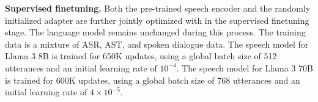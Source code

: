 \textbf{Supervised finetuning.}
Both the pre-trained speech encoder and the randomly initialized adapter are further jointly optimized with \llamathree in the supervised finetuning stage. The language model remains unchanged during this process.
The training data is a mixture of ASR, AST, and spoken dialogue data.
The speech model for Llama 3 8B is trained for 650K updates, using a global batch size of 512 utterances and an initial learning rate of $10^{-4}$.
The speech model for Llama 3 70B is trained for 600K updates, using a global batch size of 768 utterances and an initial learning rate of $4\times10^{-5}$.
